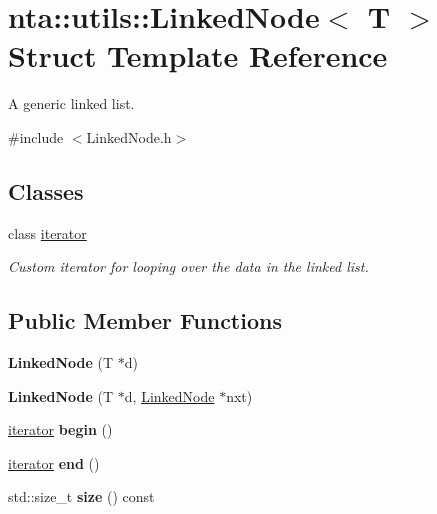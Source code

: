\hypertarget{structnta_1_1utils_1_1LinkedNode}{}\section{nta\+:\+:utils\+:\+:Linked\+Node$<$ T $>$ Struct Template Reference}
\label{structnta_1_1utils_1_1LinkedNode}


A generic linked list.  




{\ttfamily \#include $<$Linked\+Node.\+h$>$}

\subsection*{Classes}
\begin{DoxyCompactItemize}
\item 
class \hyperlink{classnta_1_1utils_1_1LinkedNode_1_1iterator}{iterator}
\begin{DoxyCompactList}\small\item\em Custom iterator for looping over the data in the linked list. \end{DoxyCompactList}\end{DoxyCompactItemize}
\subsection*{Public Member Functions}
\begin{DoxyCompactItemize}
\item 
\mbox{\label{structnta_1_1utils_1_1LinkedNode_a575e213c5d1022c298f6d9a117c8b081}} 
{\bfseries Linked\+Node} (T $\ast$d)
\item 
\mbox{\label{structnta_1_1utils_1_1LinkedNode_a7d45b5366f553fbb7a2228382c4e76db}} 
{\bfseries Linked\+Node} (T $\ast$d, \hyperlink{structnta_1_1utils_1_1LinkedNode}{Linked\+Node} $\ast$nxt)
\item 
\mbox{\label{structnta_1_1utils_1_1LinkedNode_a3fc466b54e08df4f2d9823c24b5d2334}} 
\hyperlink{classnta_1_1utils_1_1LinkedNode_1_1iterator}{iterator} {\bfseries begin} ()
\item 
\mbox{\label{structnta_1_1utils_1_1LinkedNode_a64ffaf974b9276f8860581b20bd88bf0}} 
\hyperlink{classnta_1_1utils_1_1LinkedNode_1_1iterator}{iterator} {\bfseries end} ()
\item 
\mbox{\label{structnta_1_1utils_1_1LinkedNode_aba2fa02376e3f19ed5a3a4079c9b70c4}} 
std\+::size\+\_\+t {\bfseries size} () const
\end{DoxyCompactItemize}
